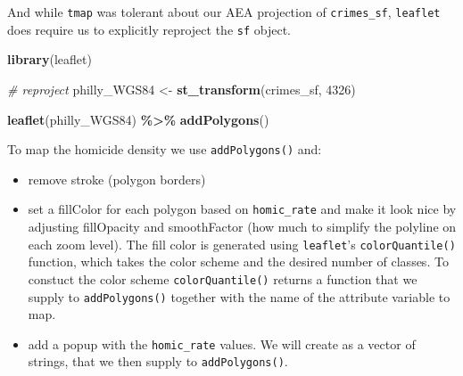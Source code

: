 \documentclass[
]{book}
\newenvironment{Shaded}{\begin{snugshade}}{\end{snugshade}}
\newcommand{\CommentTok}[1]{\textcolor[rgb]{0.56,0.35,0.01}{\textit{#1}}}
\newcommand{\DecValTok}[1]{\textcolor[rgb]{0.00,0.00,0.81}{#1}}
\newcommand{\FunctionTok}[1]{\textcolor[rgb]{0.13,0.29,0.53}{\textbf{#1}}}
\newcommand{\NormalTok}[1]{#1}
\newcommand{\OtherTok}[1]{\textcolor[rgb]{0.56,0.35,0.01}{#1}}
\newcommand{\SpecialCharTok}[1]{\textcolor[rgb]{0.81,0.36,0.00}{\textbf{#1}}}
\providecommand{\tightlist}{%
  \setlength{\itemsep}{0pt}\setlength{\parskip}{0pt}}
\begin{document}
And while \texttt{tmap} was tolerant about our AEA projection of \texttt{crimes\_sf}, \texttt{leaflet} does require us to explicitly reproject the \texttt{sf} object.

\begin{Shaded}
\begin{Highlighting}[]
\FunctionTok{library}\NormalTok{(leaflet) }

\CommentTok{\# reproject}
\NormalTok{philly\_WGS84 }\OtherTok{\textless{}{-}} \FunctionTok{st\_transform}\NormalTok{(crimes\_sf, }\DecValTok{4326}\NormalTok{)}

\FunctionTok{leaflet}\NormalTok{(philly\_WGS84) }\SpecialCharTok{\%\textgreater{}\%}
  \FunctionTok{addPolygons}\NormalTok{()}
\end{Highlighting}
\end{Shaded}

To map the homicide density we use \texttt{addPolygons()} and:

\begin{itemize}
\tightlist
\item
  remove stroke (polygon borders)\\
\item
  set a fillColor for each polygon based on \texttt{homic\_rate} and make it look nice by adjusting fillOpacity and smoothFactor (how much to simplify the polyline on each zoom level). The fill color is generated using \texttt{leaflet}'s \texttt{colorQuantile()} function, which takes the color scheme and the desired number of classes. To constuct the color scheme \texttt{colorQuantile()} returns a function that we supply to \texttt{addPolygons()} together with the name of the attribute variable to map.\\
\item
  add a popup with the \texttt{homic\_rate} values. We will create as a vector of strings, that we then supply to \texttt{addPolygons()}.
\end{itemize}
\end{document}
